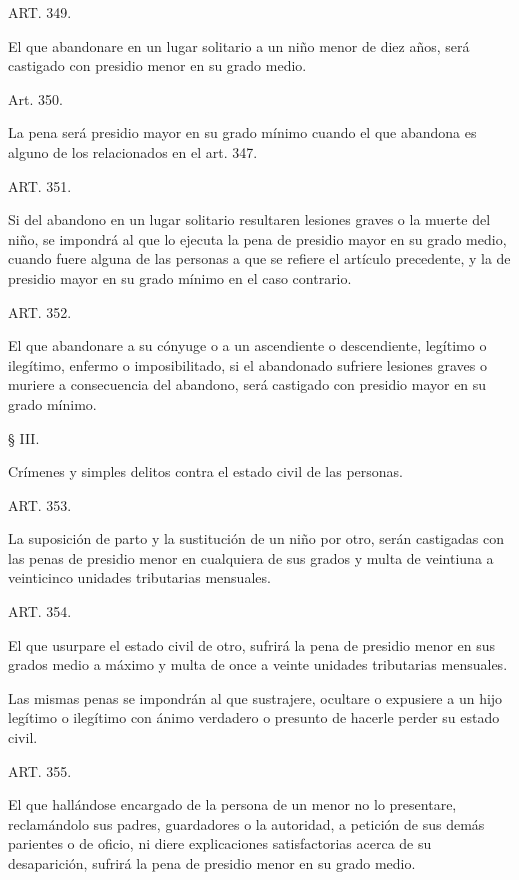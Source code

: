     ART. 349.

    El que abandonare en un lugar solitario a un niño menor de diez años, será castigado con presidio menor en su grado medio.


    Art. 350.

    La pena será presidio mayor en su grado mínimo cuando el que abandona es alguno de los relacionados en el art. 347.


    ART. 351.

    Si del abandono en un lugar solitario resultaren lesiones graves o la muerte del niño, se impondrá al que lo ejecuta la pena de presidio mayor en su grado medio, cuando fuere alguna de las personas a que se refiere el artículo precedente, y la de presidio mayor en su grado mínimo en el caso contrario.


    ART. 352.

    El que abandonare a su cónyuge o a un ascendiente o descendiente, legítimo o ilegítimo, enfermo o imposibilitado, si el abandonado sufriere lesiones graves o muriere a consecuencia del abandono, será castigado con presidio mayor en su grado mínimo.


    § III.

    Crímenes y simples delitos contra el estado civil de las personas.




    ART. 353.

    La suposición de parto y la sustitución de un niño por otro, serán castigadas con las penas de presidio menor en cualquiera de sus grados y multa de veintiuna a veinticinco unidades tributarias mensuales.









    ART. 354.

    El que usurpare el estado civil de otro, sufrirá la pena de presidio menor en sus grados medio a máximo y multa de once a veinte unidades tributarias mensuales.

    Las mismas penas se impondrán al que sustrajere, ocultare o expusiere a un hijo legítimo o ilegítimo con ánimo verdadero o presunto de hacerle perder su estado civil.







    ART. 355.

    El que hallándose encargado de la persona de un menor no lo presentare, reclamándolo sus padres, guardadores o la autoridad, a petición de sus demás parientes o de oficio, ni diere explicaciones satisfactorias acerca de su desaparición, sufrirá la pena de presidio menor en su grado medio.


